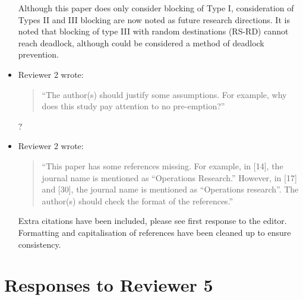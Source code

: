 \documentclass{article}
\begin{document}
\begin{itemize}
Although this paper does only consider blocking of Type I, consideration of
Types II and III blocking are now noted as future research directions.
It is noted that blocking of type III with random destinations (RS-RD) cannot
reach deadlock, although could be considered a method of deadlock prevention.

\item Reviewer 2 wrote:
\begin{quote}
``The author(s) should justify some assumptions.
For example, why does this study pay attention to no pre-emption?''
\end{quote}
?

\item Reviewer 2 wrote:
\begin{quote}
``This paper has some references missing.
For example, in [14], the journal name is mentioned as “Operations Research.”
However, in [17] and [30], the journal name is mentioned as “Operations
research”. The author(s) should check the format of the references.''
\end{quote}
Extra citations have been included, please see first response to the editor.
Formatting and capitalisation of references have been cleaned up to ensure
consistency.

\end{itemize}



\section*{Responses to Reviewer 5}
\end{document}
